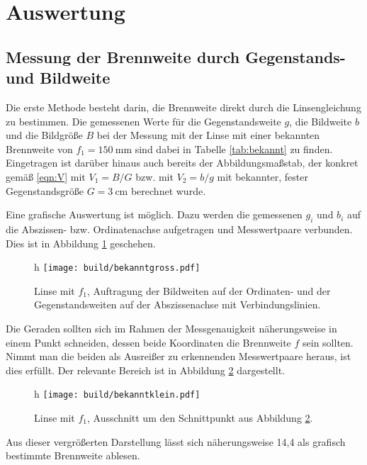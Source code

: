 \section{Auswertung}
\label{sec:Auswertung}

\subsection{Messung der Brennweite durch Gegenstands- und Bildweite}
Die erste Methode besteht darin, die Brennweite direkt durch die Linsengleichung
zu bestimmen. Die gemessenen Werte für die Gegenstandsweite $g$, die Bildweite
$b$ und die Bildgröße $B$  bei der Messung mit der Linse mit einer bekannten
Brennweite von $f_1 = \SI{150}{\milli\meter}$ sind dabei in Tabelle
\ref{tab:bekannt} zu finden. Eingetragen ist darüber hinaus auch bereits der
Abbildungsmaßstab, der konkret gemäß \eqref{eqn:V} mit $V_1=B/G$ bzw. mit $V_2=b/g$
mit bekannter, fester Gegenstandsgröße $G = \SI{3}{\centi\meter}$ berechnet wurde.


Eine grafische Auswertung ist möglich. Dazu werden die gemessenen $g_i$ und
$b_i$ auf die Abszissen- bzw. Ordinatenachse aufgetragen und Messwertpaare verbunden.
Dies ist in Abbildung \ref{fig:bekanntgross} geschehen.

\begin{figure}{h}
  \centering
  \texttt{[image: build/bekanntgross.pdf]}
  \caption{Linse mit $f_1$, Auftragung der Bildweiten auf der Ordinaten- und der Gegenstandsweiten auf der Abszissenachse mit Verbindungslinien.}
  \label{fig:bekanntgross}
\end{figure}

Die Geraden sollten sich im Rahmen der Messgenauigkeit näherungsweise in einem Punkt
schneiden, dessen beide Koordinaten die Brennweite $f$ sein sollten. Nimmt man die
beiden als Ausreißer zu erkennenden Messwertpaare heraus, ist dies
erfüllt. Der relevante Bereich ist in Abbildung \ref{fig:bekanntklein} dargestellt.

\begin{figure}{h}
  \centering
  \texttt{[image: build/bekanntklein.pdf]}
  \caption{Linse mit $f_1$, Ausschnitt um den Schnittpunkt aus Abbildung \ref{fig:bekanntklein}.}
  \label{fig:bekanntklein}
\end{figure}

Aus dieser vergrößerten Darstellung lässt sich näherungsweise 14,4 als grafisch
bestimmte Brennweite ablesen.

